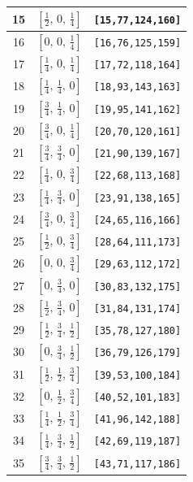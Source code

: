 \documentclass[fleqn,8pt]{jsarticle}
\begin{document}
\begin{longtable}{ccc}
15 & $\left[ \frac{1}{2},\, 0,\, \frac{1}{4} \right]$ & {\tt [15,77,124,160]} \\ \hline
16 & $\left[ 0,\, 0,\, \frac{1}{4} \right]$ & {\tt [16,76,125,159]} \\ \hline
17 & $\left[ \frac{1}{4},\, 0,\, \frac{1}{4} \right]$ & {\tt [17,72,118,164]} \\ \hline
18 & $\left[ \frac{1}{4},\, \frac{1}{4},\, 0 \right]$ & {\tt [18,93,143,163]} \\ \hline
19 & $\left[ \frac{3}{4},\, \frac{1}{4},\, 0 \right]$ & {\tt [19,95,141,162]} \\ \hline
20 & $\left[ \frac{3}{4},\, 0,\, \frac{1}{4} \right]$ & {\tt [20,70,120,161]} \\ \hline
21 & $\left[ \frac{3}{4},\, \frac{3}{4},\, 0 \right]$ & {\tt [21,90,139,167]} \\ \hline
22 & $\left[ \frac{1}{4},\, 0,\, \frac{3}{4} \right]$ & {\tt [22,68,113,168]} \\ \hline
23 & $\left[ \frac{1}{4},\, \frac{3}{4},\, 0 \right]$ & {\tt [23,91,138,165]} \\ \hline
24 & $\left[ \frac{3}{4},\, 0,\, \frac{3}{4} \right]$ & {\tt [24,65,116,166]} \\ \hline
25 & $\left[ \frac{1}{2},\, 0,\, \frac{3}{4} \right]$ & {\tt [28,64,111,173]} \\ \hline
26 & $\left[ 0,\, 0,\, \frac{3}{4} \right]$ & {\tt [29,63,112,172]} \\ \hline
27 & $\left[ 0,\, \frac{3}{4},\, 0 \right]$ & {\tt [30,83,132,175]} \\ \hline
28 & $\left[ \frac{1}{2},\, \frac{3}{4},\, 0 \right]$ & {\tt [31,84,131,174]} \\ \hline
29 & $\left[ \frac{1}{2},\, \frac{3}{4},\, \frac{1}{2} \right]$ & {\tt [35,78,127,180]} \\ \hline
30 & $\left[ 0,\, \frac{3}{4},\, \frac{1}{2} \right]$ & {\tt [36,79,126,179]} \\ \hline
31 & $\left[ \frac{1}{2},\, \frac{1}{2},\, \frac{3}{4} \right]$ & {\tt [39,53,100,184]} \\ \hline
32 & $\left[ 0,\, \frac{1}{2},\, \frac{3}{4} \right]$ & {\tt [40,52,101,183]} \\ \hline
33 & $\left[ \frac{1}{4},\, \frac{1}{2},\, \frac{3}{4} \right]$ & {\tt [41,96,142,188]} \\ \hline
34 & $\left[ \frac{1}{4},\, \frac{3}{4},\, \frac{1}{2} \right]$ & {\tt [42,69,119,187]} \\ \hline
35 & $\left[ \frac{3}{4},\, \frac{3}{4},\, \frac{1}{2} \right]$ & {\tt [43,71,117,186]} \\ \hline

\end{longtable}
\end{document}
